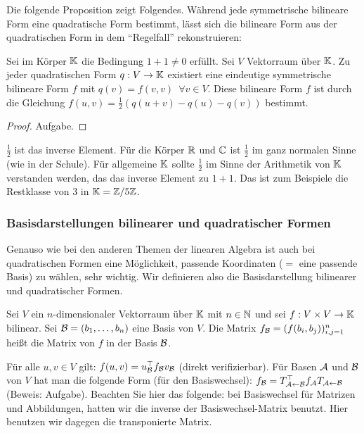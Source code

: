 Die folgende Proposition zeigt Folgendes. Während jede symmetrische bilineare Form eine quadratische Form bestimmt, lässt sich die bilineare Form aus der quadratischen Form in dem ``Regelfall'' rekonstruieren: 

\begin{propn}[Polarisationsformel]
	Sei im Körper $ \mathbb K $ die Bedingung $ 1+1 \neq 0 $ erfüllt. Sei $ V $ Vektorraum über $ \mathbb K $. Zu jeder quadratischen Form $ q : V \to \mathbb K $ existiert eine eindeutige symmetrische bilineare Form $ f $ mit $ q(v) = f(v,v) \enspace \forall v \in V $. Diese bilineare Form $ f $ ist durch die Gleichung $ f(u,v) = \frac{1}{2}(q(u+v) - q(u) - q(v)) $ bestimmt.
\end{propn}
\begin{proof}
	Aufgabe.
\end{proof}
\begin{bem}
	$ \frac{1}{2} $ ist das inverse Element. Für die Körper $\mathbb R$ und $\mathbb C$ ist $\frac{1}{2}$ im ganz normalen Sinne (wie in der Schule). Für allgemeine $\mathbb K$ sollte $\frac{1}{2}$ im Sinne der Arithmetik von $\mathbb K$ verstanden werden, das das inverse Element zu $1+1$. Das ist zum Beispiele die Restklasse von $3$ in $\mathbb K = \mathbb Z / 5 \mathbb Z$.
\end{bem}

\subsubsection{Basisdarstellungen bilinearer und quadratischer Formen}

Genauso wie bei den anderen Themen der linearen Algebra ist auch bei quadratischen Formen eine Möglichkeit, passende Koordinaten ($=$ eine passende Basis) zu wählen, sehr wichtig. Wir definieren also die Basisdarstellung bilinearer und quadratischer Formen. 

Sei $ V $ ein $ n $-dimensionaler Vektorraum über $ \mathbb K $ mit $ n \in \mathbb N $ und sei $ f : V \times V \to \mathbb K $ bilinear. Sei $ \mathcal{B}= (b_1, \ldots, b_n) $ eine Basis von $ V $. Die Matrix $ f_{\mathcal{B}} = (f(b_i,b_j)){}_{i,j=1}^n $ heißt die Matrix von $ f $ in der Basis $ \mathcal{B} $.

Für alle $ u,v \in V $ gilt: $ f(u,v) = u_{\mathcal{B}}^\top f_{\mathcal{B}} v_{\mathcal{B}} $ (direkt verifizierbar). Für Basen $ \mathcal{A} $ und $ \mathcal{B} $ von $ V $ hat man die folgende Form (für den Basiswechsel): $ f_{\mathcal{B}} = T_{\mathcal{A}\gets\mathcal{B}}^\top f_{\mathcal{A}} T_{\mathcal{A}\gets\mathcal{B}} $ (Beweis: Aufgabe). Beachten Sie hier das folgende: bei Basiswechsel für Matrizen und Abbildungen, hatten wir die inverse der Basiswechsel-Matrix benutzt. Hier benutzen wir dagegen die transponierte Matrix. 


